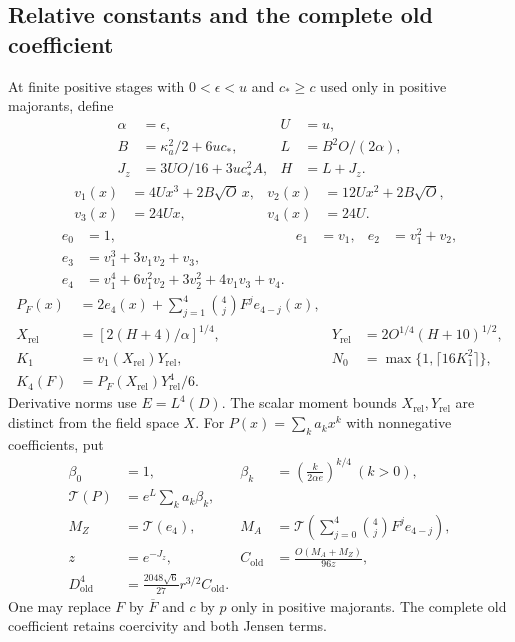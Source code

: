 \subsection{Relative constants and the complete old coefficient}
At finite positive stages with $0<\epsilon<u$ and $c_*\ge c$ used only
in positive majorants, define
\begin{align*}
 \alpha&=\epsilon,& U&=u,\\
 B&=\kappa_a^2/2+6uc_*,&L&=B^2O/(2\alpha),\\
 J_z&=3UO/16+3uc_*^2 A,&H&=L+J_z.
\end{align*}
\begin{align*}
 v_1(x)&=4Ux^3+2B\sqrt O\,x,&v_2(x)&=12Ux^2+2B\sqrt O,\\
 v_3(x)&=24Ux,&v_4(x)&=24U.
\end{align*}
\begin{align*}
 e_0&=1,&e_1&=v_1,&e_2&=v_1^2+v_2,\\
 e_3&=v_1^3+3v_1v_2+v_3,\\
 e_4&=v_1^4+6v_1^2v_2+3v_2^2+4v_1v_3+v_4.
\end{align*}
\begin{align*}
 P_F(x)&=2e_4(x)+\sum_{j=1}^4\binom4j F^j e_{4-j}(x),\\
 X_{\mathrm{rel}}&=[2(H+4)/\alpha]^{1/4},&
 Y_{\mathrm{rel}}&=2O^{1/4}(H+10)^{1/2},\\
 K_1&=v_1(X_{\mathrm{rel}})Y_{\mathrm{rel}},&
 N_0&=\max\{1,\lceil16K_1^2\rceil\},\\
 K_4(F)&=P_F(X_{\mathrm{rel}})Y_{\mathrm{rel}}^4/6.
\end{align*}
Derivative norms use $E=L^4(D)$. The scalar moment bounds
$X_{\mathrm{rel}},Y_{\mathrm{rel}}$ are distinct from the field space $X$.
For $P(x)=\sum_k a_kx^k$ with nonnegative coefficients, put
\begin{align*}
 \beta_0&=1,&\beta_k&=\left(\frac{k}{2\alpha e}\right)^{k/4}\ (k>0),\\
 \mathcal T(P)&=e^L\sum_k a_k\beta_k,\\
 M_Z&=\mathcal T(e_4),&
 M_A&=\mathcal T\left(\sum_{j=0}^4\binom4jF^je_{4-j}\right),\\
 z&=e^{-J_z},&C_{\mathrm{old}}&=\frac{O(M_A+M_Z)}{96z},\\
 D_{\mathrm{old}}^4&=\frac{2048\sqrt6}{27}r^{3/2}C_{\mathrm{old}}.
\end{align*}
One may replace $F$ by $\overline F$ and $c$ by $p$ only in positive
majorants. The complete old coefficient retains coercivity and both Jensen terms.

